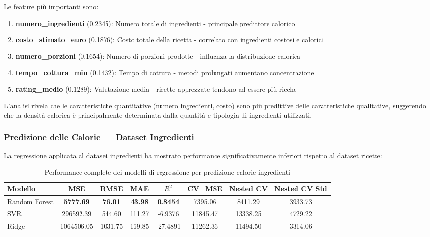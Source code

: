 \documentclass[12pt,a4paper]{article}
\begin{document}
Le feature più importanti sono:
\begin{enumerate}
    \item \textbf{numero\_ingredienti} (0.2345): Numero totale di ingredienti - principale predittore calorico
    \item \textbf{costo\_stimato\_euro} (0.1876): Costo totale della ricetta - correlato con ingredienti costosi e calorici
    \item \textbf{numero\_porzioni} (0.1654): Numero di porzioni prodotte - influenza la distribuzione calorica
    \item \textbf{tempo\_cottura\_min} (0.1432): Tempo di cottura - metodi prolungati aumentano concentrazione
    \item \textbf{rating\_medio} (0.1289): Valutazione media - ricette apprezzate tendono ad essere più ricche
\end{enumerate}

L'analisi rivela che le caratteristiche quantitative (numero ingredienti, costo) sono più predittive delle caratteristiche qualitative, suggerendo che la densità calorica è principalmente determinata dalla quantità e tipologia di ingredienti utilizzati.

\subsubsection{Predizione delle Calorie --- Dataset Ingredienti}

La regressione applicata al dataset ingredienti ha mostrato performance significativamente inferiori rispetto al dataset ricette:

\begin{table}[H]
\centering
\begin{tabular}{@{}lccccccc@{}}
\toprule
\textbf{Modello} & \textbf{MSE} & \textbf{RMSE} & \textbf{MAE} & \textbf{$R^2$} & \textbf{CV\_MSE} & \textbf{Nested CV} & \textbf{Nested CV Std} \\
\midrule
Random Forest & \textbf{5777.69} & \textbf{76.01} & \textbf{43.98} & \textbf{0.8454} & 7395.06 & 8411.29 & 3933.73 \\
SVR & 296592.39 & 544.60 & 111.27 & -6.9376 & 11845.47 & 13338.25 & 4729.22 \\
Ridge & 1064506.05 & 1031.75 & 169.85 & -27.4891 & 11262.36 & 11494.50 & 3314.06 \\
\bottomrule
\end{tabular}
\caption{Performance complete dei modelli di regressione per predizione calorie ingredienti}
\label{tab:regression_results_ingredienti}
\end{table}
\end{document}
